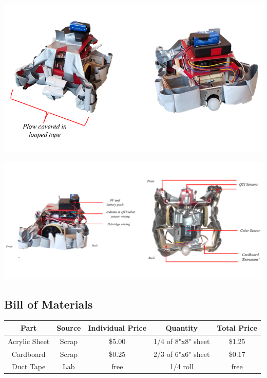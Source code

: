 \documentclass[11.5pt]{article}
\begin{document}
\begin{center}
\includegraphics[scale=2]{Images/product1}
\end{center}

\begin{center}
\includegraphics[scale=1.7]{Images/product2}
\end{center}


\subsection{Bill of Materials}
\begin{center}
\begin{tabular}{ |c|c|c|c|c| } 
\hline
Part & Source & Individual Price & Quantity & Total Price\\
\hline
Acrylic Sheet & Scrap & \$5.00 & 1/4 of 8"x8" sheet & \$1.25\\ 
\hline
Cardboard & Scrap & \$0.25 & 2/3 of 6"x6" sheet & \$0.17\\
\hline
Duct Tape & Lab & free & 1/4 roll & free\\
\hline
\end{tabular}
\end{center}
\end{document}

